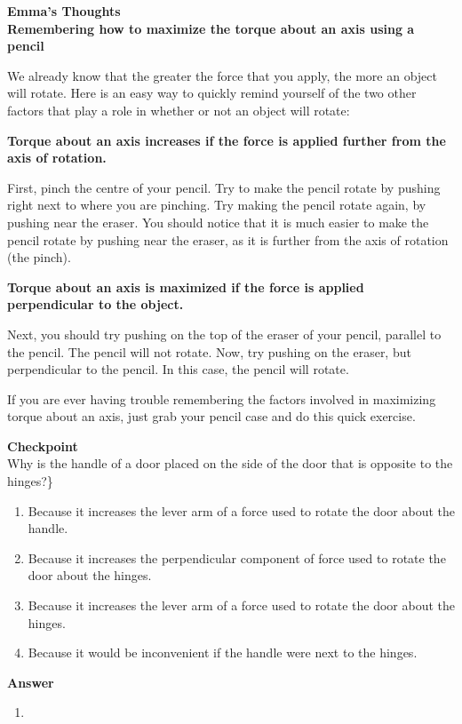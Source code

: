 \begin{framed}
\textbf{Emma's Thoughts}\\
\textbf{Remembering how to maximize the torque about an axis using a pencil}

We already know that the greater the force that you apply, the more an object will rotate. Here is an easy way to quickly remind yourself of the two other factors that play a role in whether or not an object will rotate:

\textbf{Torque about an axis increases if the force is applied further from the axis of rotation.}

First, pinch the centre of your pencil. Try to make the pencil rotate by pushing right next to where you are pinching. Try making the pencil rotate again, by pushing near the eraser. You should notice that it is much easier to make the pencil rotate by pushing near the eraser, as it is further from the axis of rotation (the pinch).

\textbf{Torque about an axis is maximized if the force is applied perpendicular to the object.}

Next, you should try pushing on the top of the eraser of your pencil, parallel to the pencil. The pencil will not rotate. Now, try pushing on the eraser, but perpendicular to the pencil. In this case, the pencil will rotate.

If you are ever having trouble remembering the factors involved in maximizing torque about an axis, just grab your pencil case and do this quick exercise.
\end{framed}

\begin{framed}
\textbf{Checkpoint}\\
Why is the handle of a door placed on the side of the door that is opposite to the hinges?\}

\begin{enumerate}
\item Because it increases the lever arm of a force used to rotate the door about the handle.
\item Because it increases the perpendicular component of force used to rotate the door about the hinges.
\item Because it increases the lever arm of a force used to rotate the door about the hinges.
\item Because it would be inconvenient if the handle were next to the hinges.
\end{enumerate}

\begin{framed}
\textbf{Answer}\\
\begin{enumerate}[resume]
\item
\end{enumerate}
\end{framed}
\end{framed}

